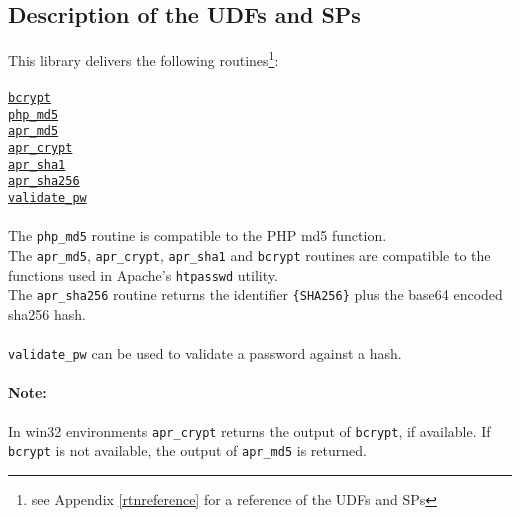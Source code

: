 \subsection{Description of the UDFs and SPs}
This library delivers the following routines\footnote{see Appendix \ref{rtnreference} for a reference of the UDFs and SPs}:\\
\\
\hyperlink{hbcrypt}{\tt bcrypt}\\
\hyperlink{hphpmd5}{\tt php\_md5}\\
\hyperlink{haprmd5}{\tt apr\_md5}\\
\hyperlink{haprcrypt}{\tt apr\_crypt}\\
\hyperlink{haprsha1}{\tt apr\_sha1}\\
\hyperlink{haprsha256}{\tt apr\_sha256}\\
\hyperlink{hvalidatepw}{\tt validate\_pw}\\
\\
The {\tt php\_md5} routine is compatible to the PHP md5 function.\\
The {\tt apr\_md5}, {\tt apr\_crypt}, {\tt apr\_sha1} and {\tt bcrypt} routines are compatible to the functions used in Apache's {\tt htpasswd} utility.\\
The {\tt apr\_sha256} routine returns the identifier {\tt \{SHA256\}} plus the base64 encoded sha256 hash.\\
\\
{\tt validate\_pw} can be used to validate a password against a hash.
\paragraph{Note:}{In win32 environments {\tt apr\_crypt} returns the output of {\tt bcrypt}, if available. If {\tt bcrypt} is not available, the output of {\tt apr\_md5} is returned.}
